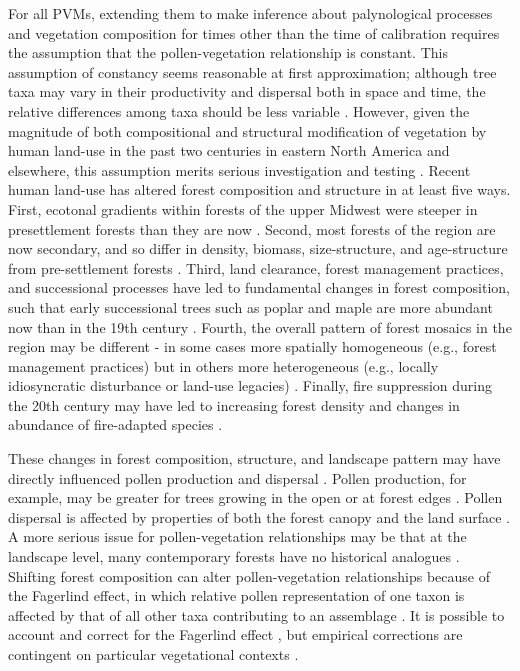 \documentclass[12pt]{article}
\begin{document}
For all PVMs, extending them to make inference about palynological
processes and vegetation composition for times other than the time of
calibration requires the assumption that the pollen-vegetation
relationship is constant. This assumption of constancy seems
reasonable at first approximation; although tree taxa may vary in
their productivity and dispersal both in space and time, the relative
differences among taxa should be less variable
\citep{parsons1981statistical}.  However, given the magnitude of both
compositional and structural modification of vegetation by human
land-use in the past two centuries in eastern North America and
elsewhere, this assumption merits serious investigation and testing
\citep{kujawa2015}. Recent human land-use has altered forest
composition and structure in at least five ways.  First, ecotonal
gradients within forests of the upper Midwest were steeper in
presettlement forests than they are now
\citep{goring_witness}. Second, most forests of the region are now
secondary, and so differ in density, biomass, size-structure, and
age-structure from pre-settlement forests
\citep{rhemtulla2009legacies}.  Third, land clearance, forest
management practices, and successional processes have led to
fundamental changes in forest composition, such that early
successional trees such as poplar and maple are more abundant now than
in the 19th century \citep{thompson2013four}.  Fourth, the overall
pattern of forest mosaics in the region may be different - in some
cases more spatially homogeneous (e.g., forest management practices)
but in others more heterogeneous (e.g., locally idiosyncratic
disturbance or land-use legacies) \citep{thompson2013four,
  wang2007spatial}. Finally, fire suppression during the 20th century
may have led to increasing forest density and changes in abundance of
fire-adapted species \citep{nowacki2008demise}.

These changes in forest composition, structure, and landscape pattern
may have directly influenced pollen production and dispersal
\citep{kujawa2015}.  Pollen production, for example, may be greater
for trees growing in the open or at forest edges
\citep{feldman1999cost}.  Pollen dispersal is affected by properties
of both the forest canopy and the land surface
\citep{jackson1999pollen}.  A more serious issue for pollen-vegetation
relationships may be that at the landscape level, many contemporary
forests have no historical analogues \citep{goring_witness}. Shifting
forest composition can alter pollen-vegetation relationships because
of the Fagerlind effect, in which relative pollen representation of
one taxon is affected by that of all other taxa contributing to an
assemblage \citep{prentice1988records}. It is possible to account and
correct for the Fagerlind effect \citep{prentice1986,
  jackson1995exploration}, but empirical corrections are contingent on
particular vegetational contexts \citep{jackson1998quantitative}.
\end{document}
